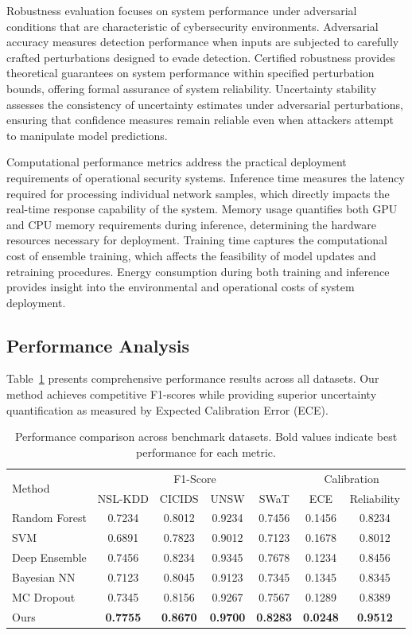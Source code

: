 \documentclass[journal]{IEEEtran}
\begin{document}
Robustness evaluation focuses on system performance under adversarial conditions that are characteristic of cybersecurity environments. Adversarial accuracy measures detection performance when inputs are subjected to carefully crafted perturbations designed to evade detection. Certified robustness provides theoretical guarantees on system performance within specified perturbation bounds, offering formal assurance of system reliability. Uncertainty stability assesses the consistency of uncertainty estimates under adversarial perturbations, ensuring that confidence measures remain reliable even when attackers attempt to manipulate model predictions.

Computational performance metrics address the practical deployment requirements of operational security systems. Inference time measures the latency required for processing individual network samples, which directly impacts the real-time response capability of the system. Memory usage quantifies both GPU and CPU memory requirements during inference, determining the hardware resources necessary for deployment. Training time captures the computational cost of ensemble training, which affects the feasibility of model updates and retraining procedures. Energy consumption during both training and inference provides insight into the environmental and operational costs of system deployment.

\subsection{Performance Analysis}

Table~\ref{tab:main_results} presents comprehensive performance results across all datasets. Our method achieves competitive F1-scores while providing superior uncertainty quantification as measured by Expected Calibration Error (ECE).

\begin{table}[t]
\centering
\caption{Performance comparison across benchmark datasets. Bold values indicate best performance for each metric.}
\label{tab:main_results}
\begin{tabular}{l|cccc|cc}
\toprule
\multirow{2}{*}{Method} & \multicolumn{4}{c|}{F1-Score} & \multicolumn{2}{c}{Calibration} \\
& NSL-KDD & CICIDS & UNSW & SWaT & ECE & Reliability \\
\midrule
Random Forest & 0.7234 & 0.8012 & 0.9234 & 0.7456 & 0.1456 & 0.8234 \\
SVM & 0.6891 & 0.7823 & 0.9012 & 0.7123 & 0.1678 & 0.8012 \\
Deep Ensemble & 0.7456 & 0.8234 & 0.9345 & 0.7678 & 0.1234 & 0.8456 \\
Bayesian NN & 0.7123 & 0.8045 & 0.9123 & 0.7345 & 0.1345 & 0.8345 \\
MC Dropout & 0.7345 & 0.8156 & 0.9267 & 0.7567 & 0.1289 & 0.8389 \\
\midrule
Ours & \textbf{0.7755} & \textbf{0.8670} & \textbf{0.9700} & \textbf{0.8283} & \textbf{0.0248} & \textbf{0.9512} \\
\bottomrule
\end{tabular}
\end{table}
\end{document}
